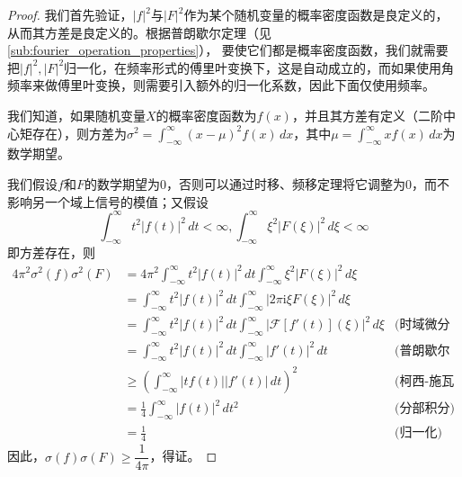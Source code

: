 \begin{proof}
    我们首先验证，$|f|^2$与$|F|^2$作为某个随机变量的概率密度函数是良定义的，从而其方差是良定义的。根据普朗歇尔定理（见\ref{sub:fourier_operation_properties}），
    要使它们都是概率密度函数，我们就需要把$|f|^2,|F|^2$归一化，在频率形式的傅里叶变换下，这是自动成立的，而如果使用角频率来做傅里叶变换，则需要引入额外的归一化系数，因此下面仅使用频率。

    我们知道，如果随机变量$X$的概率密度函数为$f(x)$，并且其方差有定义（二阶中心矩存在），则方差为$\sigma^2=\int_{-\infty}^{\infty}(x-\mu)^2 f(x)\,dx$，其中$\mu=\int_{-\infty}^{\infty}x f(x)\,dx$为数学期望。
    
    我们假设$f$和$F$的数学期望为0，否则可以通过时移、频移定理将它调整为0，而不影响另一个域上信号的模值；又假设\[\int_{-\infty}^{\infty}t^2|f(t)|^2\,dt<\infty,\int_{-\infty}^{\infty}\xi^2|F(\xi)|^2\,d\xi<\infty\]
    即方差存在，则\begin{align*}
    4\pi^2 \sigma^2(f)\sigma^2(F)&=4\pi^2 \int_{-\infty}^{\infty}t^2|f(t)|^2\,dt\int_{-\infty}^{\infty}\xi^2|F(\xi)|^2\,d\xi\\
    &=\int_{-\infty}^{\infty}t^2|f(t)|^2\,dt\int_{-\infty}^{\infty}|2\pi \mathrm{i}\xi F(\xi)|^2\,d\xi\\
    &=\int_{-\infty}^{\infty}t^2|f(t)|^2\,dt\int_{-\infty}^{\infty}\left| \mathcal{F} [f'(t)](\xi)\right|^2\,d\xi&\text{(时域微分性质)}\\
    &=\int_{-\infty}^{\infty}t^2|f(t)|^2\,dt\int_{-\infty}^{\infty}| f'(t)|^2\,dt&\text{(普朗歇尔定理)}\\
    &\geq \left(\int_{-\infty}^{\infty}|tf(t)||f'(t)|\,dt\right)^2&\text{(柯西-施瓦兹不等式)}\\
    &=\frac{1}{4}\int_{-\infty}^{\infty}|f(t)|^2\,dt^2&\text{(分部积分)}\\
    &=\frac{1}{4}&\text{(归一化)}
    \end{align*}
    因此，$\sigma(f)\sigma(F)\geq \dfrac{1}{4\pi}$，得证。
\end{proof}

